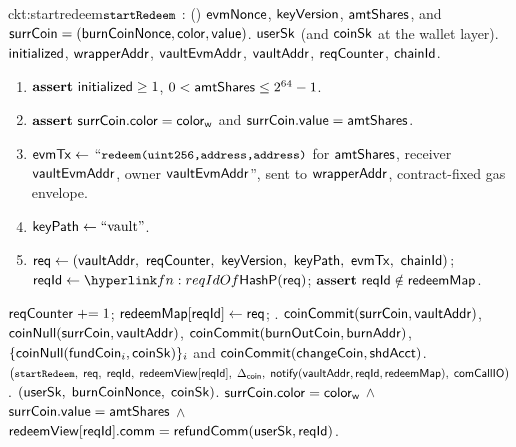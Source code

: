 \begin{CktBox}{ckt:startredeem}{$\texttt{\small startRedeem}$ : (\srcStartRedeem)}
 $\mathsf{evmNonce}$, $\mathsf{keyVersion}$, $\mathsf{amtShares}$, and
$\mathsf{surrCoin} = (\mathsf{burnCoinNonce}, \mathsf{color}, \mathsf{value})$.
 $\mathsf{userSk}$ (and $\mathsf{coinSk}$ at the wallet layer).
 $\mathsf{initialized}$, $\mathsf{wrapperAddr}$, $\mathsf{vaultEvmAddr}$, $\mathsf{vaultAddr}$, $\mathsf{reqCounter}$, $\mathsf{chainId}$.
\begin{enumerate}[nosep,leftmargin=1.7em,topsep=2pt]
\item $\textbf{assert}~ \mathsf{initialized} \geq 1$, \; $0 < \mathsf{amtShares} \leq 2^{64}-1$.
\item $\textbf{assert}~ \mathsf{surrCoin}.\mathsf{color} = \mathsf{color}_{\mathsf{w}}$ \; and \; $\mathsf{surrCoin}.\mathsf{value} = \mathsf{amtShares}$.
\item $\mathsf{evmTx} \gets$ ``$\texttt{\small redeem(uint256,address,address)}$ for $\mathsf{amtShares}$, receiver $\mathsf{vaultEvmAddr}$, owner
      $\mathsf{vaultEvmAddr}$'', sent to $\mathsf{wrapperAddr}$, contract-fixed gas envelope.
\item $\mathsf{keyPath} \gets \text{``vault''}$.
\item $\req \gets (\vaultAddr\bc \sigNonce\bc \keyVer\bc \keyPath\bc \evmTxOf\bc \chainId)$; \;
      $\rid \gets \lnk{fn:reqIdOf}{\reqIdOf(\req)}$; \; $\textbf{assert}~ \mathsf{reqId} \notin \mathsf{redeemMap}$.
\end{enumerate}
\begin{OutList}
\oitem{\Dvault} $\mathsf{reqCounter} \mathrel{+}= 1$; \; $\mathsf{redeemMap}[\mathsf{reqId}] \gets \mathsf{req}$; \;
  .
\oitem{\Dshd} \bluedot $\mathsf{coinCommit}(\mathsf{surrCoin}, \mathsf{vaultAddr})$, \;
  \bluedot $\mathsf{coinNull}(\mathsf{surrCoin}, \mathsf{vaultAddr})$, \;
  \bluedot $\mathsf{coinCommit}(\mathsf{burnOutCoin}, \mathsf{burnAddr})$, \;
  \bluedot $\{\mathsf{coinNull}(\mathsf{fundCoin}_i, \mathsf{coinSk})\}_i$ and $\mathsf{coinCommit}(\mathsf{changeCoin}, \mathsf{shdAcct})$.
\oitem{\stmt} $\bigl(\texttt{\small startRedeem},\; \mathsf{req},\; \mathsf{reqId},\; \mathsf{redeemView}[\mathsf{reqId}],\; \Delta_{\mathsf{coin}},\;
  \mathsf{notify}(\mathsf{vaultAddr}, \mathsf{reqId}, \mathsf{redeemMap}),\; \mathsf{comCallIO}\bigr)$.
\oitem{\wit} $(\mathsf{userSk},\; \mathsf{burnCoinNonce},\; \mathsf{coinSk})$.
\oitem{\Rel} $\mathsf{surrCoin}.\mathsf{color} = \mathsf{color}_{\mathsf{w}}$ \;$\wedge$\; $\mathsf{surrCoin}.\mathsf{value} = \mathsf{amtShares}$
  \;$\wedge$\; $\mathsf{redeemView}[\mathsf{reqId}].\mathsf{comm} = \mathsf{refundComm}(\mathsf{userSk}, \mathsf{reqId})$.
\end{OutList}
\end{CktBox}


